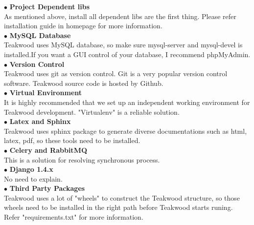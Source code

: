 $\bullet$ \textbf{Project Dependent libs}\\
As mentioned above, install all dependent libs are the first thing. Please refer installation guide in homepage for more information.\\

$\bullet$ \textbf{MySQL Database}\\
Teakwood uses MySQL database, so make sure mysql-server and mysql-devel is installed.If you want a GUI control of your database, I recommend phpMyAdmin. \\

$\bullet$ \textbf{Version Control}\\
Teakwood uses git as version control. Git is a very popular version control software. Teakwood source code is hosted by Github.\\

$\bullet$ \textbf{Virtual Environment}\\
It is highly recommended that we set up an independent working environment for Teakwood development. "Virtualenv" is a reliable solution.\\

$\bullet$ \textbf{Latex and Sphinx}\\
Teakwood uses sphinx package to generate diverse documentations such as html, latex, pdf, so these tools need to be installed.\\

$\bullet$ \textbf{Celery and RabbitMQ}\\
This is a solution for resolving synchronous process.\\

$\bullet$ \textbf{Django 1.4.x}\\
No need to explain. \\

$\bullet$ \textbf{Third Party Packages}\\
Teakwood uses a lot of "wheels" to construct the Teakwood structure, so those wheels need to be installed in the right path before Teakwood starts runing. Refer "requirements.txt" for more information.





